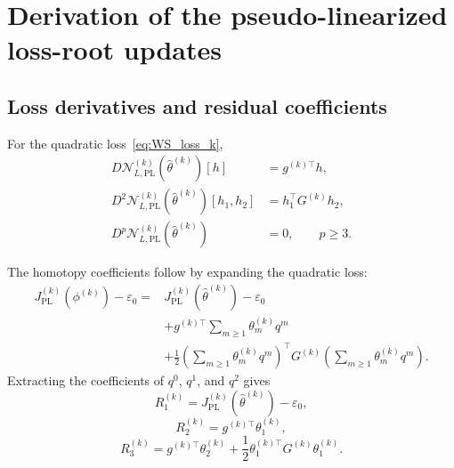 \documentclass[11pt]{article}
\theoremstyle{remark}
\begin{document}
\section{Derivation of the pseudo-linearized loss-root updates}
\label{app:gotham_loss_updates}

\subsection{Loss derivatives and residual coefficients}

For the quadratic loss~\eqref{eq:WS_loss_k},
\begin{equation}
\label{eq:loss_root_derivatives}
\begin{aligned}
    D\mathcal{N}_{L,\mathrm{PL}}^{(k)}(\hat{\theta}^{(k)})[h]
    &=
    g^{(k)\top}h,\\
    D^2\mathcal{N}_{L,\mathrm{PL}}^{(k)}(\hat{\theta}^{(k)})[h_1,h_2]
    &=
    h_1^\top G^{(k)}h_2,\\
    D^p\mathcal{N}_{L,\mathrm{PL}}^{(k)}(\hat{\theta}^{(k)})
    &=
    0,
    \qquad p\geq 3.
\end{aligned}
\end{equation}

The homotopy coefficients follow by expanding the quadratic loss:
\begin{equation}
\begin{aligned}
 J_{\mathrm{PL}}^{(k)}(\phi^{(k)})-\varepsilon_0
 ={}&J_{\mathrm{PL}}^{(k)}(\hat\theta^{(k)})-\varepsilon_0\\
 &+g^{(k)\top}\sum_{m\ge1}\theta_m^{(k)}q^m\\
 &+\frac12\left(\sum_{m\ge1}\theta_m^{(k)}q^m\right)^\top
       G^{(k)}\left(\sum_{m\ge1}\theta_m^{(k)}q^m\right).
\end{aligned}
\end{equation}
Extracting the coefficients of $q^0$, $q^1$, and $q^2$ gives
\begin{equation}
\label{eq:loss_root_R1}
    R_1^{(k)}
    =
    J_{\mathrm{PL}}^{(k)}(\hat{\theta}^{(k)})-\varepsilon_0,
\end{equation}
\begin{equation}
\label{eq:loss_root_R2}
    R_2^{(k)}
    =
    g^{(k)\top}\theta_1^{(k)},
\end{equation}
\begin{equation}
\label{eq:loss_root_R3}
    R_3^{(k)}
    =
    g^{(k)\top}\theta_2^{(k)}
    +
    \frac{1}{2}
    \theta_1^{(k)\top}
    G^{(k)}
    \theta_1^{(k)}.
\end{equation}
\end{document}
